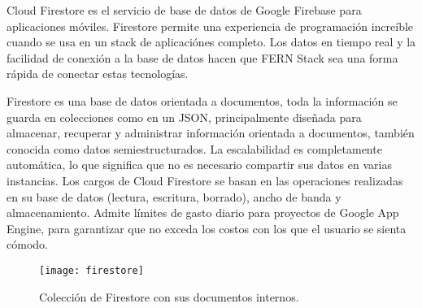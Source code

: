 Cloud Firestore es el servicio de base de datos de Google Firebase para aplicaciones móviles. Firestore permite una experiencia de programación increíble cuando se usa en un stack de aplicaciónes completo. Los datos en tiempo real y la facilidad de conexión a la base de datos hacen que FERN Stack sea una forma rápida de conectar estas tecnologías.
\vspace{0.8cm}

Firestore es una base de datos orientada a documentos, toda la información se guarda en colecciones como en un JSON, principalmente diseñada para almacenar, recuperar y administrar información orientada a documentos, también conocida como datos semiestructurados. La escalabilidad es completamente automática, lo que significa que no es necesario compartir sus datos en varias instancias. Los cargos de Cloud Firestore se basan en las operaciones realizadas en su base de datos (lectura, escritura, borrado), ancho de banda y almacenamiento. Admite límites de gasto diario para proyectos de Google App Engine, para garantizar que no exceda los costos con los que el usuario se sienta cómodo.
\vspace{0.8cm}

\begin{figure}[H]
  \centering
  \texttt{[image: firestore]}
  \caption{Colección de Firestore con sus documentos internos.}
\end{figure}